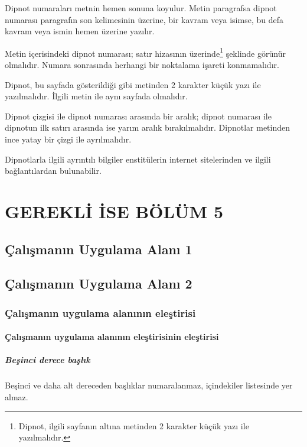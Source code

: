 \documentclass[a4paper,oneside,12pt]{report}
\begin{document}
Dipnot numaraları metnin hemen sonuna koyulur. Metin paragrafsa dipnot numarası paragrafın son kelimesinin üzerine, bir kavram veya isimse, bu defa kavram veya ismin hemen üzerine yazılır.

Metin içerisindeki dipnot numarası; satır hizasının üzerinde\footnote{Dipnot, ilgili sayfanın altına metinden 2 karakter küçük yazı ile yazılmalıdır.} şeklinde görünür olmalıdır. Numara sonrasında herhangi bir noktalama işareti konmamalıdır.

Dipnot, bu sayfada gösterildiği gibi metinden 2 karakter küçük yazı ile yazılmalıdır. İlgili metin ile aynı sayfada olmalıdır. 

Dipnot çizgisi ile dipnot numarası arasında bir aralık; dipnot numarası ile dipnotun ilk satırı arasında ise yarım aralık bırakılmalıdır. Dipnotlar metinden ince yatay bir çizgi ile ayrılmalıdır. 

Dipnotlarla ilgili ayrıntılı bilgiler enstitülerin internet sitelerinden ve ilgili bağlantılardan bulunabilir.

\chapter{GEREKLİ İSE BÖLÜM 5}
\label{chap:bolum5}
\lipsum[1][1-6]
\section{Çalışmanın Uygulama Alanı 1}
\label{sec:bolum51}
\lipsum[1][1-5]
\section{Çalışmanın Uygulama Alanı 2}
\label{sec:bolum52}
\lipsum[1][1-5]
\subsection{Çalışmanın uygulama alanının eleştirisi}
\label{subsec:bolum521}
\lipsum[1][1-7]
\subsubsection{Çalışmanın uygulama alanının eleştirisinin eleştirisi}
\label{subsec:bolum5211}
\lipsum[1][1-5]
\paragraph{Beşinci derece başlık}
Beşinci ve daha alt dereceden başlıklar numaralanmaz, içindekiler listesinde yer almaz. \lipsum[1][1-5]
\end{document}
